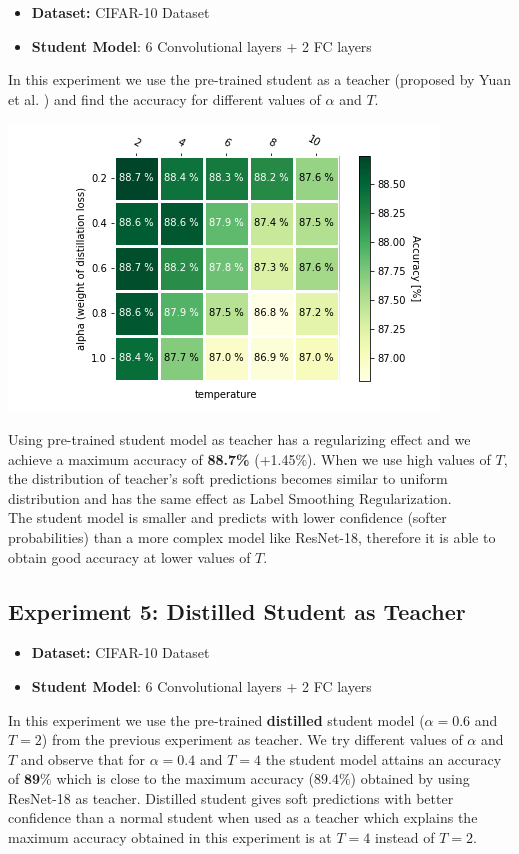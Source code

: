 \documentclass{article} %
\begin{document}
	\begin{itemize}
		\item \textbf{Dataset:} CIFAR-10 Dataset
		\item \textbf{Student Model}: 6 Convolutional layers + 2 FC layers 
	\end{itemize}
	In this experiment we use the pre-trained student as a teacher (proposed by Yuan et al. \cite{teacherfree}) and find the accuracy for different values of $\alpha$ and $T$.
	
	\newpage
	\includegraphics[scale=0.7]{fig/SSgrid.png}
	
	Using pre-trained student model as teacher has a regularizing effect and we achieve a maximum accuracy of \textbf{88.7\%} (+1.45\%). When we use high values of $T$, the distribution of teacher's soft predictions becomes similar to uniform distribution and has the same effect as Label Smoothing Regularization.\\
	The student model is smaller and predicts with lower confidence (softer probabilities) than a more complex model like ResNet-18, therefore it is able to obtain good accuracy at lower values of $T$.
	
	
	\subsection{Experiment 5: Distilled Student as Teacher}
	\begin{itemize}
		\item \textbf{Dataset:} CIFAR-10 Dataset
		\item \textbf{Student Model}: 6 Convolutional layers + 2 FC layers 
	\end{itemize}
	In this experiment we use the pre-trained \textbf{distilled} student model ($\alpha=0.6$ and $T=2$) from the previous experiment as teacher. We try different values of $\alpha$ and $T$ and observe that for $\alpha=0.4$ and $T=4$ the student model attains an accuracy of $\mathbf{89\%}$ which is close to the maximum accuracy ($\mathbf{89.4\%}$) obtained by using ResNet-18 as teacher. 
	Distilled student gives soft predictions with better confidence than a normal student when used as a teacher which explains the maximum accuracy obtained in this experiment is at $T=4$ instead of $T=2$.
	
\end{document}
